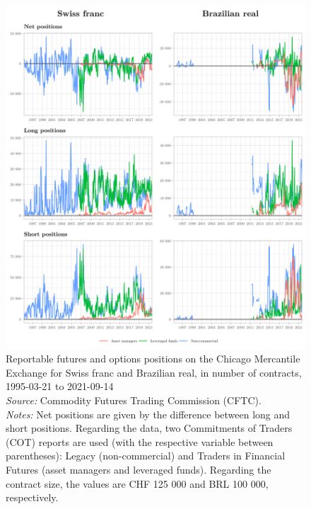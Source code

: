 \documentclass[a4paper, twoside]{templates/ociamthesis}
\begin{document}
\begin{figure}[!ht]

{\centering \includegraphics[width=0.99\columnwidth]{figure/GTOG_6} 

}

\caption[Reportable futures and options positions on the Chicago Mercantile Exchange for Swiss franc and Brazilian real, in number of contracts, 1995-03-21 to 2021-09-14]{Reportable futures and options positions on the Chicago Mercantile Exchange for Swiss franc and Brazilian real, in number of contracts, 1995-03-21 to 2021-09-14 \\ \scriptsize \textit{Source:} Commodity Futures Trading Commission (CFTC). \\ \scriptsize \textit{Notes:} Net positions are given by the difference between long and short positions. Regarding the data, two Commitments of Traders (COT) reports are used (with the respective variable between parentheses): Legacy (non-commercial) and Traders in Financial Futures (asset managers and leveraged funds). Regarding the contract size, the values are CHF 125 000 and BRL 100 000, respectively.}\label{fig:Figure28}
\end{figure}
\end{document}
